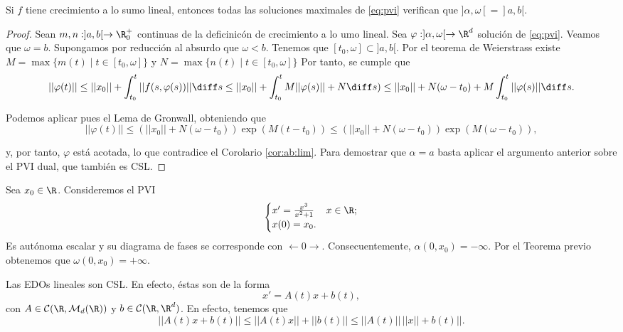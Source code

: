 \documentclass{article}
\begin{document}
\begin{theorem}
  Si $f$ tiene crecimiento a lo sumo lineal, entonces todas las soluciones maximales de
  \eqref{eq:pvi} verifican que $]\alpha, \omega[ = ]a,b[$.
\end{theorem}
\begin{proof}
  Sean $m, n : ]a,b[ \to \R_0^+$ continuas de la deficinicón de crecimiento a lo umo lineal. Sea
  $\varphi: ]\alpha, \omega[ \to \R^d$ solución de \eqref{eq:pvi}. Veamos que $\omega =
  b$. Supongamos por reducción al absurdo que $\omega < b$. Tenemos que
  $[t_0, \omega] \subset ]a,b[$. Por el teorema de Weierstrass existe
  $M = \max \{m(t) \mid t \in [t_0,\omega]\}$ y $N = \max \{n(t) \mid t \in [t_0,\omega]\}$ Por
  tanto, se cumple que
  \[ ||\varphi(t)|| \le ||x_0|| + \int_{t_0}^{t} ||f(s, \varphi(s))|| \diff s \le ||x_0|| +
    \int_{t_0}^{t} M||\varphi(s)|| + N \diff s ) \le ||x_0|| + N(\omega - t_0) + M \int_{t_0}^{t}
    ||\varphi(s)|| \diff s. \]

  Podemos aplicar pues el Lema de Gronwall, obteniendo que
  \[||\varphi(t)|| \le (||x_0|| + N (\omega-t_0)) \exp(M(t - t_0)) \le (||x_0|| + N (\omega-t_0))
    \exp(M(\omega - t_0)),\]

  y, por tanto, $\varphi$ está acotada, lo que contradice el Corolario \ref{cor:ab:lim}. Para
  demostrar que $\alpha = a$ basta aplicar el argumento anterior sobre el PVI dual, que también es
  CSL.
\end{proof}

\begin{ex}
  Sea $x_0 \in \R$. Consideremos el PVI
  \[
    \begin{cases}
      x' = \frac{x^3}{x^2+1} & x \in \R; \\
      x(0) = x_0.
    \end{cases}
  \]
  Es autónoma escalar y su diagrama de fases se corresponde con $\leftarrow 0
  \rightarrow$. Consecuentemente, $\alpha(0,x_0) = -\infty$. Por el Teorema previo obtenemos que
  $\omega(0,x_0) = +\infty$.
\end{ex}

\begin{remark}
  Las EDOs lineales son CSL. En efecto, éstas son de la forma
  \[ x' = A(t) x + b(t), \] con $A \in \mathcal{C}(\R, \mathcal{M}_{d}(\R))$ y
  $b \in \mathcal{C}(\R, \R^d)$. En efecto, tenemos que
  \[ ||A(t)x +b(t)|| \le ||A(t)x||+||b(t)|| \le ||A(t)|| \,||x|| + b(t)||. \]
\end{remark}
\end{document}
